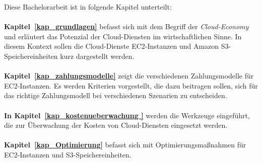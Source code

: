 
Diese Bachelorarbeit ist in folgende Kapitel unterteilt:\\\\
\textbf{Kapitel~\ref{kap_grundlagen}} 
befasst sich mit dem Begriff der \textit{Cloud-Economy} und erläutert das Potenzial der Cloud-Diensten im wirtschaftlichen Sinne. In diesem Kontext sollen die Cloud-Dienste EC2-Instanzen und Amazon S3-Speichereinheiten kurz dargestellt werden. 
\\\\
\textbf{Kapitel~\ref{kap_zahlungsmodelle}} 
zeigt die verschiedenen Zahlungsmodelle für EC2-Instanzen. Es werden Kriterien vorgestellt, die dazu beitragen sollen, sich für das richtige Zahlungsmodell bei verschiedenen Szenarien zu entscheiden. 
\\\\
\textbf{In Kapitel~\ref{kap_kostenueberwachung }} werden die Werkzeuge eingeführt, die zur Überwachung der Kosten von Cloud-Diensten eingesetzt werden.
\\\\
\textbf{Kapitel~\ref{kap_Optimierung}} befasst sich mit Optimierungsmaßnahmen %
für EC2-Instanzen und S3-Speichereinheiten.

 
